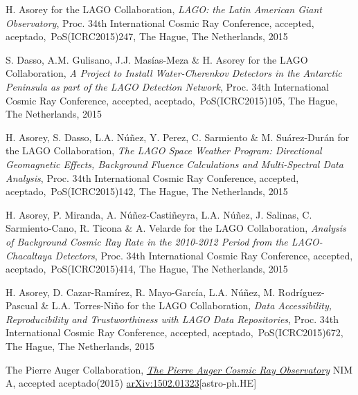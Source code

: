 \noindent
\begin{etaremune}

\item {}H. Asorey for the LAGO Collaboration, {\emph{LAGO: the Latin American Giant Observatory}}, \en Proc. 34th International Cosmic Ray Conference, \ifeng accepted, \else aceptado,\fi\ PoS(ICRC2015)247, The Hague, The Netherlands, 2015

\item {}S. Dasso, A.M. Gulisano, J.J. Masías-Meza \& H. Asorey for the LAGO Collaboration, {\emph{A Project to Install Water-Cherenkov Detectors in the Antarctic Peninsula as part of the LAGO Detection Network}}, \en Proc. 34th International Cosmic Ray Conference, \ifeng accepted, \else aceptado,\fi\ PoS(ICRC2015)105, The Hague, The Netherlands, 2015
    
\item {}H. Asorey, S. Dasso, L.A. Núñez, Y. Perez, C. Sarmiento \& M. Suárez-Durán for the LAGO Collaboration, {\emph{The LAGO Space Weather Program: Directional Geomagnetic Effects, Background Fluence Calculations and Multi-Spectral Data Analysis}}, \en Proc. 34th International Cosmic Ray Conference, \ifeng accepted, \else aceptado,\fi\ PoS(ICRC2015)142, The Hague, The Netherlands, 2015

\item {}H. Asorey, P. Miranda, A. Núñez-Castiñeyra, L.A. Núñez, J. Salinas, C. Sarmiento-Cano, R. Ticona \& A. Velarde for the LAGO Collaboration, {\emph{Analysis of Background Cosmic Ray Rate in the 2010-2012 Period from the LAGO-Chacaltaya Detectors}}, \en Proc. 34th International Cosmic Ray Conference, \ifeng accepted, \else aceptado,\fi\ PoS(ICRC2015)414, The Hague, The Netherlands, 2015

\item {}H. Asorey, D. Cazar-Ramírez, R. Mayo-García, L.A. Núñez, M. Rodríguez-Pascual \& L.A. Torres-Niño for the LAGO Collaboration, {\emph{Data Accessibility, Reproducibility and Trustworthiness with LAGO Data Repositories}}, \en Proc. 34th International Cosmic Ray Conference, \ifeng accepted, \else aceptado,\fi\ PoS(ICRC2015)672, The Hague, The Netherlands, 2015

\item {}The Pierre Auger Collaboration, \href{http://dx.doi.org/}{\emph{The Pierre Auger Cosmic Ray Observatory}} NIM A, \ifeng accepted \else aceptado\fi (2015) \href{http://arxiv.org/abs/1502.01323}{arXiv:1502.01323}[astro-ph.HE]


\end{etaremune}
